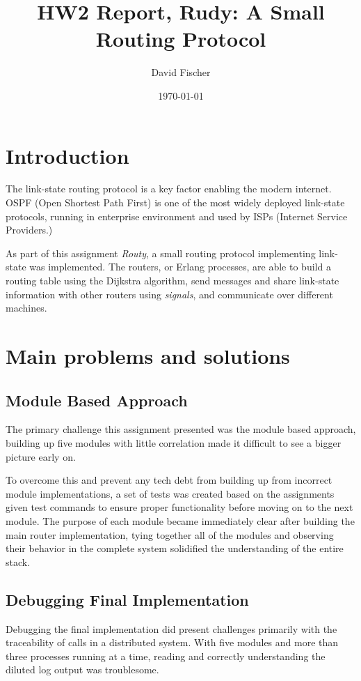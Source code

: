 \documentclass[a4paper, 11pt]{article}
\title{HW2 Report, Rudy: A Small Routing Protocol}
\author{David Fischer}
\date{\today{}}
\begin{document}
\maketitle

\section{Introduction}
The link-state routing protocol is a key factor enabling the modern internet. OSPF (Open Shortest Path First) is one of the most widely deployed link-state protocols, running in enterprise environment and used by ISPs (Internet Service Providers.)

As part of this assignment \textit{Routy}, a small routing protocol implementing link-state was implemented. 
The routers, or Erlang processes, are able to build a routing table using the Dijkstra algorithm, send messages and share link-state information with other routers using \textit{signals}, and communicate over different machines.

\section{Main problems and solutions}

\subsection{Module Based Approach}

The primary challenge this assignment presented was the module based approach, building up five modules with little correlation made it difficult to see a bigger picture early on. 

To overcome this and prevent any tech debt from building up from incorrect module implementations, a set of tests was created based on the assignments given test commands to ensure proper functionality before moving on to the next module.
The purpose of each module became immediately clear after building the main router implementation, tying together all of the modules and observing their behavior in the complete system solidified the understanding of the entire stack. 

\subsection{Debugging Final Implementation}

Debugging the final implementation did present challenges primarily with the traceability of calls in a distributed system. With five modules and more than three processes running at a time, reading and correctly understanding the diluted log output was troublesome.
\end{document}
